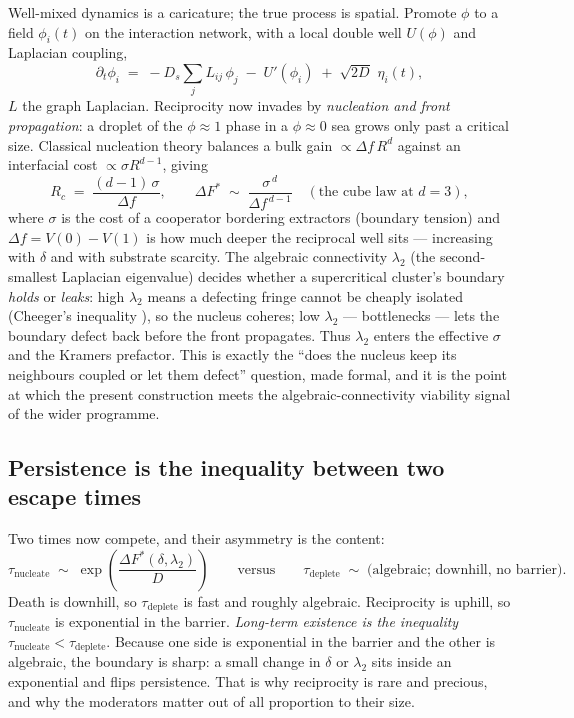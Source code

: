 \documentclass[11pt]{article}
\theoremstyle{plain}
\theoremstyle{definition}
\begin{document}
Well-mixed dynamics is a caricature; the true process is spatial. Promote $\phi$ to a field $\phi_i(t)$ on the interaction network, with a local double well $U(\phi)$ and Laplacian coupling,
\begin{equation}
\partial_t \phi_i \;=\; -D_s\!\sum_j L_{ij}\,\phi_j \;-\; U'(\phi_i) \;+\; \sqrt{2D}\,\,\eta_i(t),
\label{eq:field}
\end{equation}
$L$ the graph Laplacian. Reciprocity now invades by \emph{nucleation and front propagation}: a droplet of the $\phi \approx 1$ phase in a $\phi \approx 0$ sea grows only past a critical size. Classical nucleation theory \cite{kelton2010} balances a bulk gain $\propto \Delta f\,R^d$ against an interfacial cost $\propto \sigma R^{d-1}$, giving
\begin{equation}
R_c \;=\; \frac{(d-1)\,\sigma}{\Delta f}, \qquad
\Delta F^\ast \;\sim\; \frac{\sigma^{\,d}}{\Delta f^{\,d-1}} \quad (\text{the cube law at } d=3),
\label{eq:cubelaw}
\end{equation}
where $\sigma$ is the cost of a cooperator bordering extractors (boundary tension) and $\Delta f = V(0) - V(1)$ is how much deeper the reciprocal well sits --- increasing with $\delta$ and with substrate scarcity. The algebraic connectivity $\lambda_2$ (the second-smallest Laplacian eigenvalue) decides whether a supercritical cluster's boundary \emph{holds} or \emph{leaks}: high $\lambda_2$ means a defecting fringe cannot be cheaply isolated (Cheeger's inequality \cite{chung1997}), so the nucleus coheres; low $\lambda_2$ --- bottlenecks --- lets the boundary defect back before the front propagates. Thus $\lambda_2$ enters the effective $\sigma$ and the Kramers prefactor. This is exactly the ``does the nucleus keep its neighbours coupled or let them defect'' question, made formal, and it is the point at which the present construction meets the algebraic-connectivity viability signal of the wider programme.

\subsection{Persistence is the inequality between two escape times}

Two times now compete, and their asymmetry is the content:
\begin{equation}
\tau_{\text{nucleate}} \;\sim\; \exp\!\left(\frac{\Delta F^\ast(\delta,\lambda_2)}{D}\right)
\qquad \text{versus} \qquad
\tau_{\text{deplete}} \;\sim\; \text{(algebraic; downhill, no barrier).}
\label{eq:race}
\end{equation}
Death is downhill, so $\tau_{\text{deplete}}$ is fast and roughly algebraic. Reciprocity is uphill, so $\tau_{\text{nucleate}}$ is exponential in the barrier. \emph{Long-term existence is the inequality} $\tau_{\text{nucleate}} < \tau_{\text{deplete}}$. Because one side is exponential in the barrier and the other is algebraic, the boundary is sharp: a small change in $\delta$ or $\lambda_2$ sits inside an exponential and flips persistence. That is why reciprocity is rare and precious, and why the moderators matter out of all proportion to their size.
\end{document}
